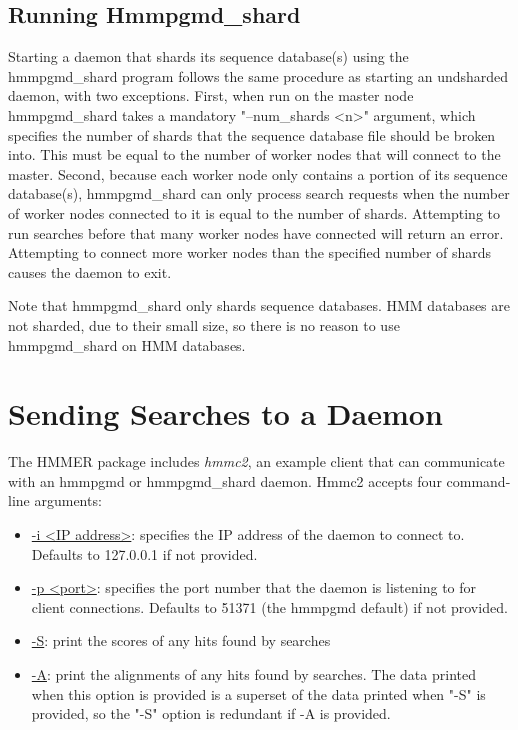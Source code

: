 \documentclass[notoc,justified]{tufte-book}    %
\begin{document}
\subsection{Running Hmmpgmd\_shard}
Starting a daemon that shards its sequence database(s) using the hmmpgmd\_shard program follows the same procedure as starting an undsharded daemon, with two exceptions.  First, when run on the master node hmmpgmd\_shard takes a mandatory "--num\_shards <n>" argument, which specifies the number of shards that the sequence database file should be broken into.  This must be equal to the number of worker nodes that will connect to the master.  Second, because each worker node only contains a portion of its sequence database(s), hmmpgmd\_shard can only process search requests when the number of worker nodes connected to it is equal to the number of shards.  Attempting to run searches before that many worker nodes have connected will return an error.  Attempting to connect more worker nodes than the specified number of shards causes the daemon to exit.

Note that hmmpgmd\_shard only shards sequence databases.  HMM databases are not sharded, due to their small size, so there is no reason to use hmmpgmd\_shard on HMM databases. 


\section{Sending Searches to a Daemon}
The HMMER package includes {\em hmmc2}, an example client that can communicate with an hmmpgmd or hmmpgmd\_shard daemon.  Hmmc2 accepts four command-line arguments:

\begin{itemize}
  \item{\underline{-i <IP address>}: specifies the IP address of the daemon to connect to.  Defaults to 127.0.0.1 if not provided.}
  \item{\underline{-p <port>}: specifies the port number that the daemon is listening to for client connections.  Defaults to 51371 (the hmmpgmd default) if not provided.}
  \item{\underline{-S}: print the scores of any hits found by searches}
  \item{\underline{-A}: print the alignments of any hits found by searches.  The data printed when this option is provided is a superset of the data printed when "-S" is provided, so the "-S" option is redundant if -A is provided.}
\end{itemize}
\end{document}
